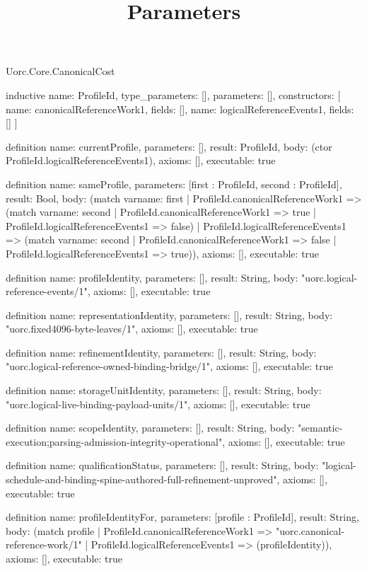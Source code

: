 \begin{lexlean}{Uorc.Core.CanonicalCost}
\title{Parameters}
\begin{semanticmodule}
inductive{
  name: ProfileId,
  type_parameters: [],
  parameters: [],
  constructors: [
    {name: canonicalReferenceWork1, fields: []},
    {name: logicalReferenceEvents1, fields: []}
  ]
}

definition{
  name: currentProfile,
  parameters: [],
  result: ProfileId,
  body: (ctor ProfileId.logicalReferenceEvents1),
  axioms: [],
  executable: true
}

definition{
  name: sameProfile,
  parameters: [first : ProfileId, second : ProfileId],
  result: Bool,
  body: (match var{name: first}
    | ProfileId.canonicalReferenceWork1 => (match var{name: second}
      | ProfileId.canonicalReferenceWork1 => true
      | ProfileId.logicalReferenceEvents1 => false)
    | ProfileId.logicalReferenceEvents1 => (match var{name: second}
      | ProfileId.canonicalReferenceWork1 => false
      | ProfileId.logicalReferenceEvents1 => true)),
  axioms: [],
  executable: true
}

definition{
  name: profileIdentity,
  parameters: [],
  result: String,
  body: "uorc.logical-reference-events/1",
  axioms: [],
  executable: true
}

definition{
  name: representationIdentity,
  parameters: [],
  result: String,
  body: "uorc.fixed4096-byte-leaves/1",
  axioms: [],
  executable: true
}

definition{
  name: refinementIdentity,
  parameters: [],
  result: String,
  body: "uorc.logical-reference-owned-binding-bridge/1",
  axioms: [],
  executable: true
}

definition{
  name: storageUnitIdentity,
  parameters: [],
  result: String,
  body: "uorc.logical-live-binding-payload-units/1",
  axioms: [],
  executable: true
}

definition{
  name: scopeIdentity,
  parameters: [],
  result: String,
  body: "semantic-execution;parsing-admission-integrity-operational",
  axioms: [],
  executable: true
}

definition{
  name: qualificationStatus,
  parameters: [],
  result: String,
  body: "logical-schedule-and-binding-spine-authored-full-refinement-unproved",
  axioms: [],
  executable: true
}

definition{
  name: profileIdentityFor,
  parameters: [profile : ProfileId],
  result: String,
  body: (match profile
    | ProfileId.canonicalReferenceWork1 => "uorc.canonical-reference-work/1"
    | ProfileId.logicalReferenceEvents1 => (profileIdentity)),
  axioms: [],
  executable: true
}


\end{semanticmodule}
\end{lexlean}
